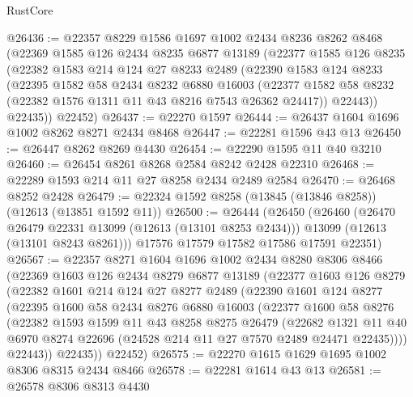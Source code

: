 \begin{lexlean}{RustCore}
\begin{coremodule}
@26436 := @22357
    @8229
    @1586
    @1697
    @1002
    @2434
    @8236
    @8262
    @8468
    (@22369
      @1585
      @126
      @2434
      @8235
      @6877
      @13189
      (@22377
        @1585
        @126
        @8235
        (@22382
          @1583
          @214
          @124
          @27
          @8233
          @2489
          (@22390
            @1583
            @124
            @8233
            (@22395
              @1582
              @58
              @2434
              @8232
              @6880
              @16003
              (@22377 @1582 @58 @8232 (@22382 @1576 @1311 @11 @43 @8216 @7543 @26362 @24417))
              @22443))
          @22435))
      @22452)
@26437 := @22270 @1597
@26444 := @26437 @1604 @1696 @1002 @8262 @8271 @2434 @8468
@26447 := @22281 @1596 @43 @13
@26450 := @26447 @8262 @8269 @4430
@26454 := @22290 @1595 @11 @40 @3210
@26460 := @26454 @8261 @8268 @2584 @8242 @2428 @22310
@26468 := @22289 @1593 @214 @11 @27 @8258 @2434 @2489 @2584
@26470 := @26468 @8252 @2428
@26479 := @22324 @1592 @8258 (@13845 (@13846 @8258)) (@12613 (@13851 @1592 @11))
@26500 := @26444
    (@26450
      (@26460
        (@26470 @26479 @22331 @13099 (@12613 (@13101 @8253 @2434)))
        @13099
        (@12613 (@13101 @8243 @8261)))
      @17576
      @17579
      @17582
      @17586
      @17591
      @22351)
@26567 := @22357
    @8271
    @1604
    @1696
    @1002
    @2434
    @8280
    @8306
    @8466
    (@22369
      @1603
      @126
      @2434
      @8279
      @6877
      @13189
      (@22377
        @1603
        @126
        @8279
        (@22382
          @1601
          @214
          @124
          @27
          @8277
          @2489
          (@22390
            @1601
            @124
            @8277
            (@22395
              @1600
              @58
              @2434
              @8276
              @6880
              @16003
              (@22377
                @1600
                @58
                @8276
                (@22382
                  @1593
                  @1599
                  @11
                  @43
                  @8258
                  @8275
                  @26479
                  (@22682
                    @1321
                    @11
                    @40
                    @6970
                    @8274
                    @22696
                    (@24528 @214 @11 @27 @7570 @2489 @24471 @22435))))
              @22443))
          @22435))
      @22452)
@26575 := @22270 @1615 @1629 @1695 @1002 @8306 @8315 @2434 @8466
@26578 := @22281 @1614 @43 @13
@26581 := @26578 @8306 @8313 @4430

\end{coremodule}
\end{lexlean}
